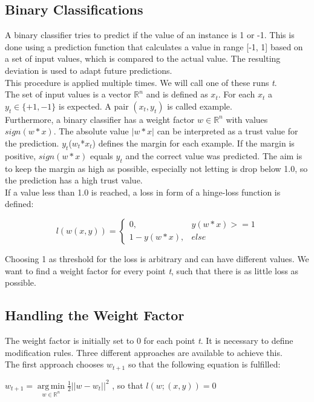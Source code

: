 \documentclass[sigconf]{acmart}
\DeclareMathOperator*{\argmin}{arg\,min}
\begin{document}
\subsection*{Binary Classifications}
A binary classifier tries to predict if the value of an instance is 1 or -1. This is done using a prediction function that calculates a value in range [-1, 1] based on a set of input values, which is compared to the actual value. The resulting deviation is used to adapt future predictions.\\
This procedure is applied multiple times. We will call one of these runs \emph{t}.\\
The set of input values is a vector $\mathbb{R}^n$ and is defined as $x_t$. For each $x_t$ a $y_t\in \{+1, -1\}$ is expected. A pair $(x_t, y_t)$ is called example.\\
Furthermore, a binary classifier has a weight factor $w\in \mathbb{R}^n$ with values $sign(w*x)$. The absolute value $|w*x|$ can be interpreted as a trust value for the prediction.
$y_t$($w_t$*$x_t$) defines the margin for each example. If the margin is positive, $sign(w*x)$ equals $y_t$ and the correct value was predicted. The aim is to keep the margin as high as possible, especially not letting is drop below 1.0, so the prediction has a high trust value.\\
If a value less than 1.0 is reached, a loss in form of a hinge-loss function is defined:

\[
  l(w(x,y))=\left\{
  \begin{array}{ll}
    0, & y(w*x)>= 1 \\
    1-y(w*x), & else
  \end{array}\right.
\]

Choosing 1 as threshold for the loss is arbitrary and can have different values. We want to find a weight factor for every point \emph{t}, such that there is as little loss as possible.

\subsection*{Handling the Weight Factor}

The weight factor is initially set to 0 for each point \emph{t}. It is necessary to define modification rules. Three different approaches are available to achieve this.\\
The first approach chooses $w_{t+1}$ so that the following equation is fulfilled:

\begin{center}
$w_{t+1} = \argmin\limits_{w\in \mathbb{R}^n}\frac{1}{2}||w-w_t||^2$ , so that $l(w;(x,y)) = 0$
\end{center}
\end{document}
